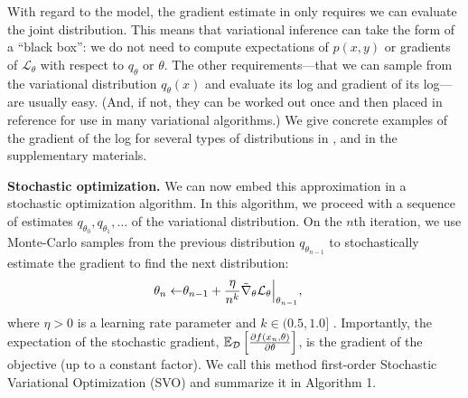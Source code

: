 


With regard to the model, the gradient estimate in 
only requires we can evaluate the joint distribution.  This means that
variational inference can take the form of a ``black box'': we do not
need to compute expectations of $p(x, y)$ or gradients of
$\mathcal{L}_\theta$ with respect to $q_\theta$ or $\theta$.  The
other requirements---that we can sample from the variational
distribution $q_\theta(x)$ and evaluate its log and gradient of its
log---are usually easy.  (And, if not, they can be worked out once and
then placed in reference for use in many variational algorithms.)  We
give concrete examples of the gradient of the log for several types of
distributions in ,  and
in the supplementary materials.



\textbf{Stochastic optimization.}  We can now embed this approximation
in a stochastic optimization algorithm.  In this algorithm, we proceed
with a sequence of estimates $q_{\theta_0}, q_{\theta_1}, \ldots$ of
the variational distribution. On the $n$th iteration, we use
Monte-Carlo samples from the previous distribution $q_{\theta_{n-1}}$
to stochastically estimate the gradient to find the next
distribution:
\begin{align}
  \label{eq:svo_update}
  \theta_n \gets & \theta_{n-1} +
  \frac{\eta}{n^k} {\tilde \nabla_{  \theta }{ \mathcal{L}_\theta }} \Bigr|_{\theta_{n-1}},
\end{align}
where $\eta > 0$ is a learning rate parameter and $k \in (0.5, 1.0]$
  \citep{carbonetto:2009}. Importantly, the expectation of the
  stochastic gradient, $\mathbb{E}_{\mathcal{D}}\left[\frac{\partial f(x_n, \theta)}{\partial \theta}\right]$, is
  the gradient of the objective (up to a constant factor).
We call this method first-order Stochastic Variational Optimization
(SVO) and summarize it in Algorithm 1. %

